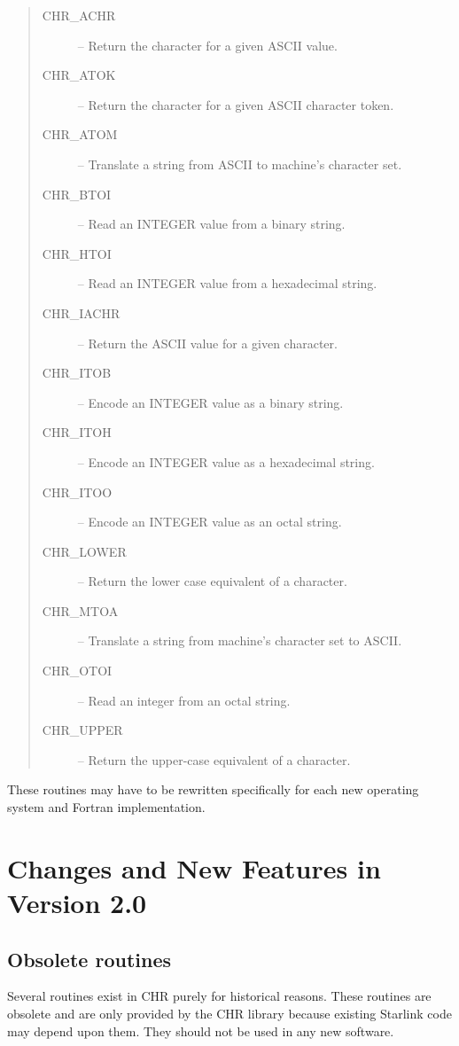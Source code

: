 \documentclass[twoside,11pt,nolof]{starlink}
\begin{document}
\begin {quote}
\begin{description}
\item [CHR\_ACHR] -- Return the character for a given ASCII value.
\item [CHR\_ATOK] -- Return the character for a given ASCII character token.
\item [CHR\_ATOM] -- Translate a string from ASCII to machine's character set.
\item [CHR\_BTOI] -- Read an INTEGER value from a binary string.
\item [CHR\_HTOI] -- Read an INTEGER value from a hexadecimal string.
\item [CHR\_IACHR] -- Return the ASCII value for a given character.
\item [CHR\_ITOB] -- Encode an INTEGER value as a binary string.
\item [CHR\_ITOH] -- Encode an INTEGER value as a hexadecimal string.
\item [CHR\_ITOO] -- Encode an INTEGER value as an octal string.
\item [CHR\_LOWER] -- Return the lower case equivalent of a character.
\item [CHR\_MTOA] -- Translate a string from machine's character set to ASCII.
\item [CHR\_OTOI] -- Read an integer from an octal string.
\item [CHR\_UPPER] -- Return the upper-case equivalent of a character.
\end {description}
\end {quote}

These routines may have to be rewritten specifically for each new
operating system and Fortran implementation.


\section {Changes and New Features in Version 2.0}

\subsection {Obsolete routines}

Several routines exist in CHR purely for historical reasons.
These routines are obsolete and are only provided by the CHR library because
existing Starlink code may depend upon them.
They should not be used in any new software.
\end{document}
